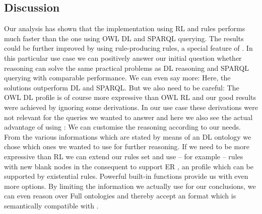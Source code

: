 \subsection{Discussion}
Our analysis has shown that the implementation using \owl RL and rules performs much faster than the one using OWL DL and SPARQL querying. The results could be 
further improved by using rule-producing rules, a special feature of \nthree. In this particular use case we can positively answer our initial question whether \nthree reasoning can 
solve the same practical problems as \owl DL reasoning and SPARQL querying with comparable performance. We can even say more: Here, the \nthree solutions outperform \owl DL and SPARQL.
But we also need to be careful: The OWL DL profile is of course more expressive than OWL RL and our good results were achieved by ignoring some derivations. 
In our use case these derivations were not relevant for the queries we wanted to answer and here we also see the actual advantage of using \nthree: We can customise the reasoning according to our needs.
From the various informations which are stated by means of an \owl DL ontology we chose which ones we wanted to use for further reasoning. If we need to be more expressive than \owl RL we can 
extend our rules set and use -- for example -- rules with new blank nodes in the consequent to support \owl ER \cite{owlex}, an \owl profile  which can be supported by existential rules. 
Powerful built-in functions provide us with even more options. By limiting the information we actually use for our conclusions, we can even reason over \owl Full ontologies 
and thereby accept an \owl format which is semantically compatible with \rdf.
% 
% 


% 
